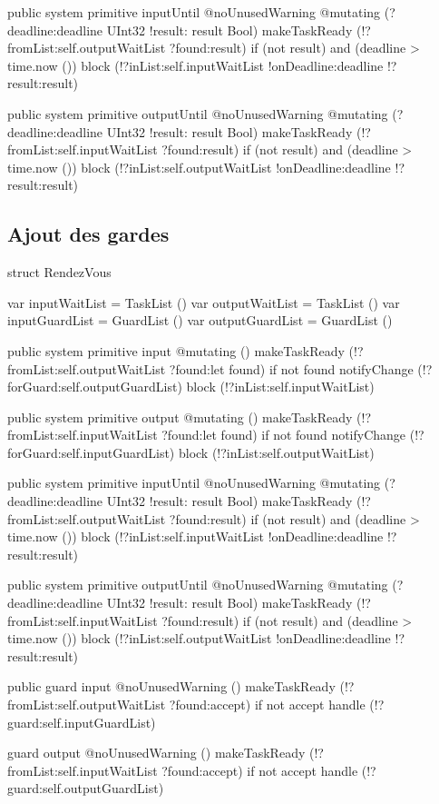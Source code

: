 \begin{OMNIBUS}
public system primitive
inputUntil @noUnusedWarning @mutating (?deadline:deadline UInt32
                                       !result: result Bool) {
  makeTaskReady (!?fromList:self.outputWaitList ?found:result)
  if (not result) and (deadline > time.now ()) {
    block (!?inList:self.inputWaitList !onDeadline:deadline !?result:result)
  }
}

public system primitive
outputUntil @noUnusedWarning @mutating (?deadline:deadline UInt32
                                        !result: result Bool) {
  makeTaskReady (!?fromList:self.inputWaitList ?found:result)
  if (not result) and (deadline > time.now ()) {
    block (!?inList:self.outputWaitList !onDeadline:deadline !?result:result)
  }
}
\end{OMNIBUS}

\subsection{Ajout des gardes}

\begin{OMNIBUS}
struct RendezVous {
  var inputWaitList = TaskList ()
  var outputWaitList = TaskList ()
  var inputGuardList = GuardList ()
  var outputGuardList = GuardList ()

  public system primitive input @mutating () {
    makeTaskReady (!?fromList:self.outputWaitList ?found:let found)
    if not found {
      notifyChange (!?forGuard:self.outputGuardList)
      block (!?inList:self.inputWaitList)
    }
  }

  public system primitive output @mutating () {
    makeTaskReady (!?fromList:self.inputWaitList ?found:let found)
    if not found {
      notifyChange (!?forGuard:self.inputGuardList)
      block (!?inList:self.outputWaitList)
    }
  }

  public system primitive
  inputUntil @noUnusedWarning @mutating (?deadline:deadline UInt32
                                         !result: result Bool) {
    makeTaskReady (!?fromList:self.outputWaitList ?found:result)
    if (not result) and (deadline > time.now ()) {
      block (!?inList:self.inputWaitList !onDeadline:deadline !?result:result)
    }
  }

  public system primitive
  outputUntil @noUnusedWarning @mutating (?deadline:deadline UInt32
                                          !result: result Bool) {
    makeTaskReady (!?fromList:self.inputWaitList ?found:result)
    if (not result) and (deadline > time.now ()) {
      block (!?inList:self.outputWaitList !onDeadline:deadline !?result:result)
    }
  }

  public guard input @noUnusedWarning () {
    makeTaskReady (!?fromList:self.outputWaitList ?found:accept)
    if not accept {
      handle (!?guard:self.inputGuardList)
    }
  }

  guard output @noUnusedWarning () {
    makeTaskReady (!?fromList:self.inputWaitList ?found:accept)
    if not accept {
      handle (!?guard:self.outputGuardList)
    }
  }

}
\end{OMNIBUS}


